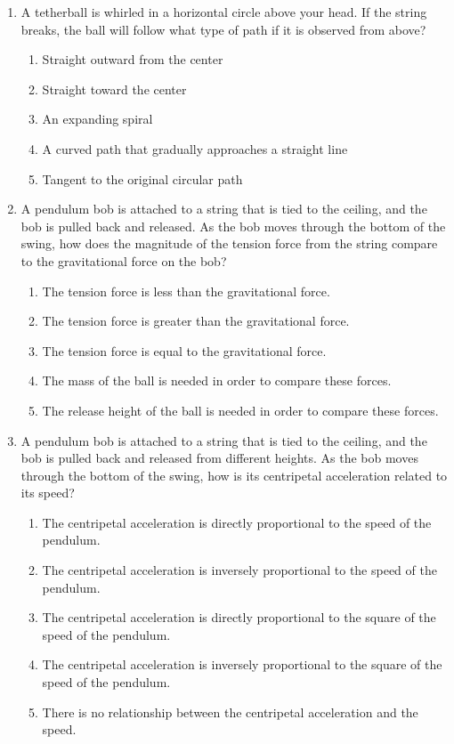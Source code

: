 \documentclass{../../../oss-apphys}
\begin{document}
\begin{multicols}{2}
\begin{enumerate}[leftmargin=18pt]
  \item A tetherball is whirled in a horizontal circle above your head. If the
    string breaks, the ball will follow what type of path if it is observed
    from above?
    \begin{enumerate}[nosep,leftmargin=18pt,label=(\Alph*)]
    \item Straight outward from the center
    \item Straight toward the center
    \item An expanding spiral
    \item A curved path that gradually approaches a straight line
    \item Tangent to the original circular path
    \end{enumerate}
    \vspace{.8in}
    
  \item A pendulum bob is attached to a string that is tied to the ceiling, and
    the bob is pulled back and released. As the bob moves through the bottom of
    the swing, how does the magnitude of the tension force from the string
    compare to the gravitational force on the bob?
    \begin{enumerate}[nosep,leftmargin=18pt,label=(\Alph*)]
    \item The tension force is less than the gravitational force.
    \item The tension force is greater than the gravitational force.
    \item The tension force is equal to the gravitational force.
    \item The mass of the ball is needed in order to compare these forces.
    \item The release height of the ball is needed in order to compare these
      forces.
    \end{enumerate}
    \columnbreak
    
  \item A pendulum bob is attached to a string that is tied to the ceiling, and
    the bob is pulled back and released from different heights. As the bob moves
    through the bottom of the swing, how is its centripetal acceleration related
    to its speed?
    \begin{enumerate}[nosep,leftmargin=18pt,label=(\Alph*)]
    \item The centripetal acceleration is directly proportional to the speed
      of the pendulum.
    \item The centripetal acceleration is inversely proportional to the speed of
      the pendulum.
    \item  The centripetal acceleration is directly proportional to the square
      of the speed of the pendulum.
    \item The centripetal acceleration is inversely proportional to the square
      of the speed of the pendulum.
    \item There is no relationship between the centripetal acceleration and
      the speed.
    \end{enumerate}
    \vspace{.7in}
    

\end{enumerate}
\end{multicols}
\end{document}
